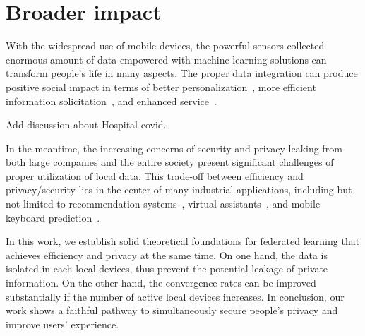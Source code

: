 
\section{Broader impact}
With the widespread use of mobile devices, the powerful sensors
collected enormous amount of data empowered with machine learning
solutions can transform people's life in many aspects. The proper
data integration can produce positive social
impact in terms of better personalization~\cite{fallah2020personalized}, more efficient information solicitation~\cite{chen2018federated}, and enhanced service~\cite{47586}.

Add discussion about Hospital covid.

In the meantime, the increasing concerns of security and
privacy leaking from both large companies and the entire society
present significant challenges of proper utilization of local
data. This trade-off between efficiency and privacy/security
lies in the center of many industrial applications, including 
but not limited to recommendation systems~\cite{chen2018federated}, virtual assistants~\cite{lamautonomy}, and mobile keyboard prediction~\cite{47586}.

In this work, we establish solid theoretical foundations for federated
learning that achieves efficiency and privacy at the same time. 
On one hand, the data is isolated in each local devices, thus prevent
the potential leakage of private information. On the other hand, the
convergence rates can be improved substantially if the number of
active local devices increases. In conclusion, our work 
shows a faithful pathway to simultaneously secure people's privacy and improve
users' experience.



